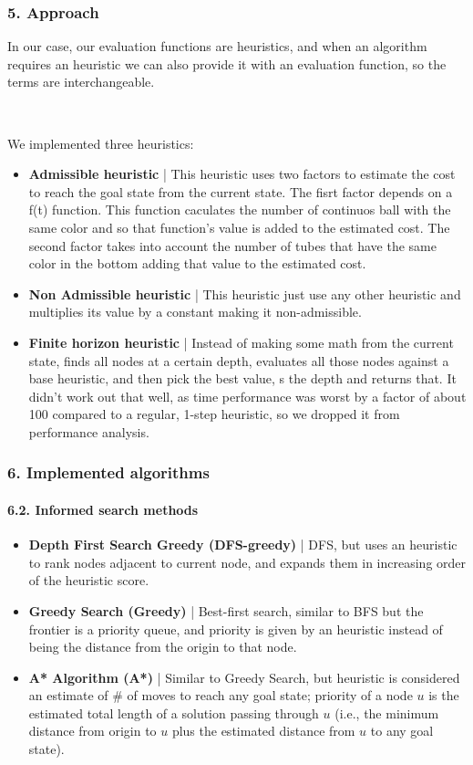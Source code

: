 \documentclass{beamer}
\begin{document}
\begin{frame}
  \frametitle{5. Approach}
  
  In our case, our evaluation functions are heuristics, and when an algorithm requires an heuristic we can also provide it with an evaluation function, so the terms are interchangeable.

  ~

  We implemented three heuristics:
  \begin{itemize}
    \item \textbf{Admissible heuristic} | This heuristic uses two factors to estimate the cost to reach the goal state from the current state. The fisrt factor depends on a f(t) function. This function caculates the number of continuos ball with the same color
    and so that function's value is added to the estimated cost. The second factor takes into account the number of tubes that have the same color in the bottom adding that value to the estimated cost.
    \item \textbf{Non Admissible heuristic} | This heuristic just use any other heuristic and multiplies its value by a constant making it non-admissible.
    \item \textbf{Finite horizon heuristic} | Instead of making some math from the current state, finds all nodes at a certain depth, evaluates all those nodes against a base heuristic, and then pick the best value, s the depth and returns that.
    It didn't work out that well, as time performance was worst by a factor of about 100 compared to a regular, 1-step heuristic, so we dropped it from performance analysis.
  \end{itemize}
  \end{frame}

\begin{frame}
\frametitle{6. Implemented algorithms}
\framesubtitle{6.2. Informed search methods}

\begin{itemize}  
  \item \textbf{Depth First Search Greedy (DFS-greedy)} | DFS, but uses an heuristic to rank nodes adjacent to current node, and expands them in increasing order of the heuristic score.
  \item \textbf{Greedy Search (Greedy)} | Best-first search, similar to BFS but the frontier is a priority queue, and priority is given by an heuristic instead of being the distance from the origin to that node.
  \item \textbf{A* Algorithm (A*)} | Similar to Greedy Search, but heuristic is considered an estimate of \# of moves to reach any goal state; priority of a node $u$ is the estimated total length of a solution passing through $u$ (i.e., the minimum distance from origin to $u$ plus the estimated distance from $u$ to any goal state).
\end{itemize}
\end{frame}
\end{document}
